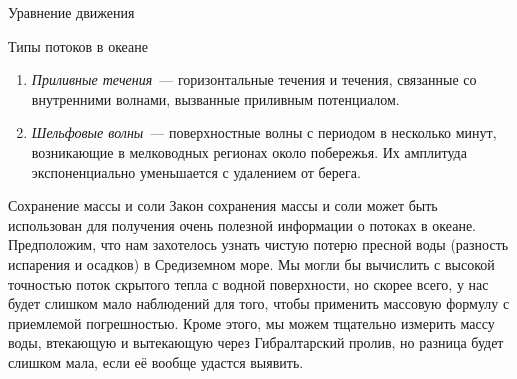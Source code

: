 \begin{chapter}{Уравнение движения}
\begin{section}{Типы потоков в океане}
\begin{enumerate}
\item
\emph{Приливные течения}~--- горизонтальные течения и течения, связанные со
внутренними волнами, вызванные приливным потенциалом.
%

\item
\emph{Шельфовые волны}~--- поверхностные волны с периодом в несколько минут, 
возникающие в мелководных регионах около побережья. Их амплитуда 
экспоненциально уменьшается с удалением от берега.
%
\end{enumerate}
\end{section}

\begin{section}{Сохранение массы и соли}
Закон сохранения массы и соли может быть использован для получения
очень полезной информации о потоках в океане. Предположим,
что нам захотелось узнать чистую потерю пресной воды (разность испарения и
осадков) в Средиземном море. Мы могли бы вычислить с высокой точностью поток
скрытого тепла с водной поверхности, но скорее всего, у нас будет слишком
мало наблюдений для того, чтобы применить массовую формулу с приемлемой 
погрешностью. Кроме этого, мы можем тщательно измерить массу воды, 
втекающую и вытекающую через Гибралтарский пролив, но разница будет 
слишком мала, если её вообще удастся выявить.
%


\end{section}
\end{chapter}
